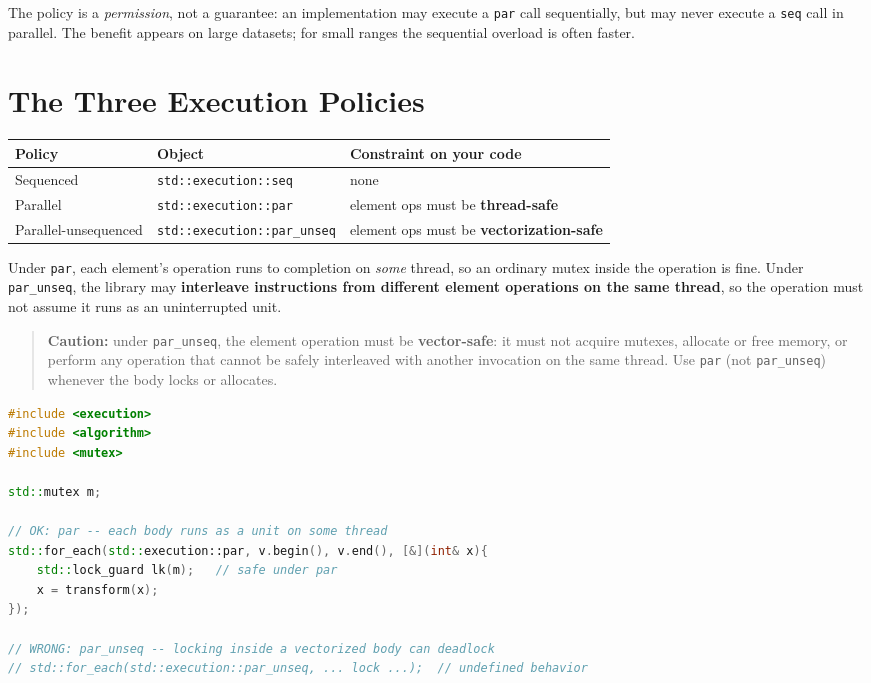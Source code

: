 The policy is a \emph{permission}, not a guarantee: an implementation may execute a \texttt{par} call sequentially, but may never execute a \texttt{seq} call in parallel. The benefit appears on large datasets; for small ranges the sequential overload is often faster.

\section{The Three Execution Policies}
\label{sec:c17-three-policies}

\begin{center}
\begin{tabular}{lll}
\hline
\textbf{Policy} & \textbf{Object} & \textbf{Constraint on your code} \\
\hline
Sequenced & \texttt{std::execution::seq} & none \\
Parallel & \texttt{std::execution::par} & element ops must be \textbf{thread-safe} \\
Parallel-unsequenced & \texttt{std::execution::par\_unseq} & element ops must be \textbf{vectorization-safe} \\
\hline
\end{tabular}
\end{center}

Under \texttt{par}, each element's operation runs to completion on \emph{some} thread, so an ordinary mutex inside the operation is fine. Under \texttt{par\_unseq}, the library may \textbf{interleave instructions from different element operations on the same thread}, so the operation must not assume it runs as an uninterrupted unit.

\begin{quote}
\textbf{Caution:} under \texttt{par\_unseq}, the element operation must be \textbf{vector-safe}: it must not acquire mutexes, allocate or free memory, or perform any operation that cannot be safely interleaved with another invocation on the same thread. Use \texttt{par} (not \texttt{par\_unseq}) whenever the body locks or allocates.
\end{quote}

\begin{lstlisting}[language=C++,caption={par is safe with a lock; par\_unseq is NOT}]
#include <execution>
#include <algorithm>
#include <mutex>

std::mutex m;

// OK: par -- each body runs as a unit on some thread
std::for_each(std::execution::par, v.begin(), v.end(), [&](int& x){
    std::lock_guard lk(m);   // safe under par
    x = transform(x);
});

// WRONG: par_unseq -- locking inside a vectorized body can deadlock
// std::for_each(std::execution::par_unseq, ... lock ...);  // undefined behavior
\end{lstlisting}

